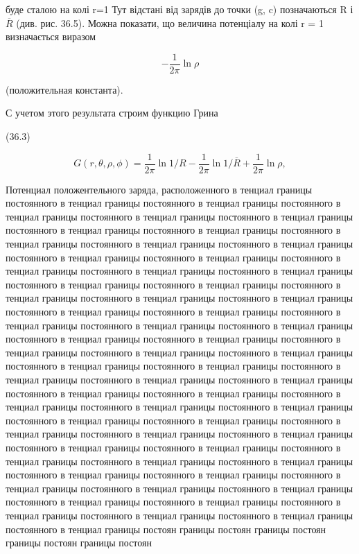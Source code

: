 \documentclass[
  ukrainian,
]{article}
\begin{document}
буде сталою на колі r=1 Тут відстані від зарядів до точки (g, c)
позначаються R і \(\overline{R}\) (див. рис. 36.5). Можна показати, що
величина потенціалу на колі r = 1 визначається виразом

\[
-\frac{1}{2\pi}\ln\rho
\]

(положительная константа).

С учетом этого результата строим функцию Грина

(36.3)

\[
G(r, \theta, \rho, \phi) = \frac{1}{2\pi} \ln 1/R - \frac{1}{2\pi} \ln 1/\overline{R} + \frac{1}{2\pi} \ln \rho,
\]

Потенциал положентельного заряда, расположенного в тенциал границы
постоянного в тенциал границы постоянного в тенциал границы постоянного
в тенциал границы постоянного в тенциал границы постоянного в тенциал
границы постоянного в тенциал границы постоянного в тенциал границы
постоянного в тенциал границы постоянного в тенциал границы постоянного
в тенциал границы постоянного в тенциал границы постоянного в тенциал
границы постоянного в тенциал границы постоянного в тенциал границы
постоянного в тенциал границы постоянного в тенциал границы постоянного
в тенциал границы постоянного в тенциал границы постоянного в тенциал
границы постоянного в тенциал границы постоянного в тенциал границы
постоянного в тенциал границы постоянного в тенциал границы постоянного
в тенциал границы постоянного в тенциал границы постоянного в тенциал
границы постоянного в тенциал границы постоянного в тенциал границы
постоянного в тенциал границы постоянного в тенциал границы постоянного
в тенциал границы постоянного в тенциал границы постоянного в тенциал
границы постоянного в тенциал границы постоянного в тенциал границы
постоянного в тенциал границы постоянного в тенциал границы постоянного
в тенциал границы постоянного в тенциал границы постоянного в тенциал
границы постоянного в тенциал границы постоянного в тенциал границы
постоянного в тенциал границы постоянного в тенциал границы постоянного
в тенциал границы постоянного в тенциал границы постоянного в тенциал
границы постоянного в тенциал границы постоянного в тенциал границы
постоянного в тенциал границы постоянного в тенциал границы постоянного
в тенциал границы постоянного в тенциал границы постоянного в тенциал
границы постоянного в тенциал границы постоянного в тенциал границы
постоянного в тенциал границы постоянного в тенциал границы постоянного
в тенциал границы постоянного в тенциал границы постоянного в тенциал
границы постоян границы постоян границы постоян границы постоян границы
постоян
\end{document}
